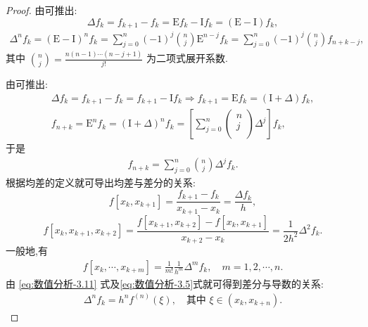\documentclass[../../main.tex]{subfiles}
\begin{document}
\begin{proof}
由可推出:
\[
\Delta f_k = f_{k+1} - f_k = \mathrm{E}f_k - \mathrm{I}f_k = (\mathrm{E} - \mathrm{I})f_k,
\]
\begin{align*}
\Delta^n f_k = (\mathrm{E} - \mathrm{I})^n f_k = \sum_{j=0}^n (-1)^j \binom{n}{j} \mathrm{E}^{n-j} f_k = \sum_{j=0}^n (-1)^j \binom{n}{j} f_{n+k-j},
\end{align*}
其中 $\binom{n}{j} = \frac{n(n-1)\cdots(n-j+1)}{j!}$ 为二项式展开系数.

由可推出:
\begin{gather*}
\Delta f_k=f_{k+1}-f_k=f_{k+1}-\mathrm{I}f_k\Longrightarrow f_{k+1}=\mathrm{E}f_k=(\mathrm{I}+\Delta )f_k,
\\
f_{n+k}=\mathrm{E}^nf_k=(\mathrm{I}+\Delta )^nf_k=\left[ \sum_{j=0}^n{\left( \begin{array}{c}
n\\
j\\
\end{array} \right) \Delta ^j} \right] f_k,
\end{gather*}
于是
\begin{align*}
f_{n+k} = \sum_{j=0}^n \binom{n}{j} \Delta^j f_k.
\end{align*}
根据均差的定义就可导出均差与差分的关系:
\[
f[x_k, x_{k+1}] = \frac{f_{k+1} - f_k}{x_{k+1} - x_k} = \frac{\Delta f_k}{h},
\]
\[
f[x_k, x_{k+1}, x_{k+2}] = \frac{f[x_{k+1}, x_{k+2}] - f[x_k, x_{k+1}]}{x_{k+2} - x_k} = \frac{1}{2h^2} \Delta^2 f_k.
\]
一般地,有
\begin{align*}
f[x_k, \cdots, x_{k+m}] = \frac{1}{m!} \frac{1}{h^m} \Delta^m f_k, \quad m = 1, 2, \cdots, n. 
\end{align*}
由 \eqref{eq:数值分析-3.11} 式及\eqref{eq:数值分析-3.5}式就可得到差分与导数的关系:
\begin{align*}
\Delta^n f_k = h^n f^{(n)}(\xi), \quad \text{其中 } \xi \in (x_k, x_{k+n}).
\end{align*}

\end{proof}
\end{document}
